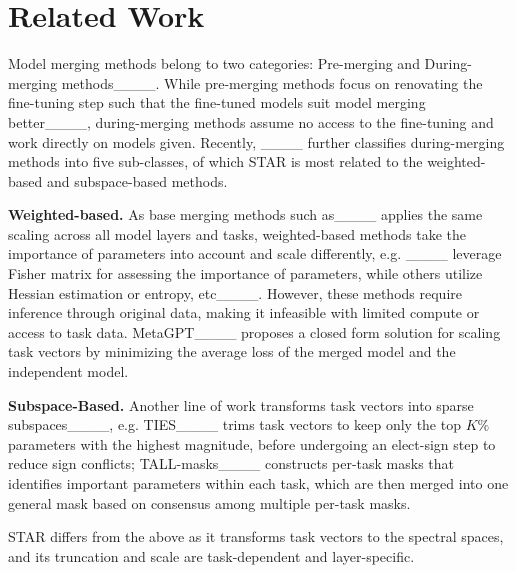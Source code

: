 \section{Related Work}
Model merging methods belong to two categories: Pre-merging and During-merging methods____. While pre-merging methods focus on renovating the fine-tuning step such that the fine-tuned models suit model merging better____, during-merging methods assume no access to the fine-tuning and work directly on models given. Recently, ____ further classifies during-merging methods into five sub-classes,
of which STAR is most related to the weighted-based and subspace-based methods.

\noindent\textbf{Weighted-based.}
As base merging methods such as____ applies the same scaling across all model layers and tasks, weighted-based methods take the importance of parameters into account and scale differently, e.g. ____ leverage Fisher matrix for assessing the importance of parameters, while others utilize Hessian estimation or entropy, etc____. 
However, these methods require inference through original data, making it infeasible with limited compute or access to task data.
MetaGPT____ proposes a closed form solution for scaling task vectors by minimizing the average loss of the merged model and the independent model.  

\noindent\textbf{Subspace-Based.} Another line of work transforms task vectors into sparse subspaces____,
e.g. TIES____ trims task vectors to keep only the top \(K\%\) parameters with the highest magnitude, before undergoing an elect-sign step to reduce sign conflicts; TALL-masks____ constructs per-task masks that identifies important parameters within each task, which are then merged into one general mask based on consensus among multiple per-task masks.

STAR differs from the above as it transforms task vectors to the spectral spaces, and its truncation and scale are task-dependent and layer-specific.